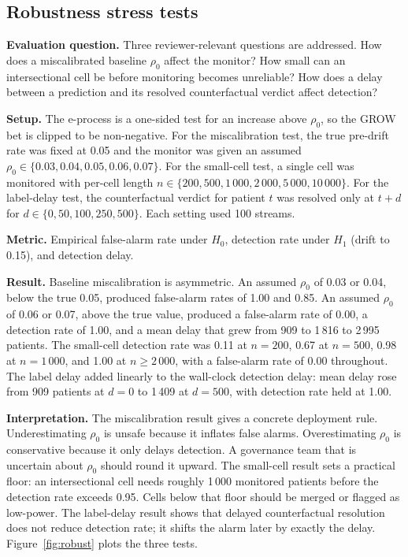 \documentclass[acmsmall,nonacm,review,anonymous]{acmart}
\newcommand{\1}[1]{\mathbf{1}\!\left\{#1\right\}}
\begin{document}
\subsection{Robustness stress tests}\label{sec:exp_robust}

\textbf{Evaluation question.}
Three reviewer-relevant questions are addressed. How does a miscalibrated baseline $\rho_0$ affect the monitor? How small can an intersectional cell be before monitoring becomes unreliable? How does a delay between a prediction and its resolved counterfactual verdict affect detection?

\textbf{Setup.}
The e-process is a one-sided test for an increase above $\rho_0$, so the GROW bet is clipped to be non-negative. For the miscalibration test, the true pre-drift rate was fixed at 0.05 and the monitor was given an assumed $\rho_0 \in \{0.03, 0.04, 0.05, 0.06, 0.07\}$. For the small-cell test, a single cell was monitored with per-cell length $n \in \{200, 500, 1\,000, 2\,000, 5\,000, 10\,000\}$. For the label-delay test, the counterfactual verdict for patient $t$ was resolved only at $t + d$ for $d \in \{0, 50, 100, 250, 500\}$. Each setting used 100 streams.

\textbf{Metric.}
Empirical false-alarm rate under $H_0$, detection rate under $H_1$ (drift to 0.15), and detection delay.

\textbf{Result.}
Baseline miscalibration is asymmetric. An assumed $\rho_0$ of 0.03 or 0.04, below the true 0.05, produced false-alarm rates of 1.00 and 0.85. An assumed $\rho_0$ of 0.06 or 0.07, above the true value, produced a false-alarm rate of 0.00, a detection rate of 1.00, and a mean delay that grew from 909 to 1\,816 to 2\,995 patients. The small-cell detection rate was 0.11 at $n = 200$, 0.67 at $n = 500$, 0.98 at $n = 1\,000$, and 1.00 at $n \ge 2\,000$, with a false-alarm rate of 0.00 throughout. The label delay added linearly to the wall-clock detection delay: mean delay rose from 909 patients at $d = 0$ to 1\,409 at $d = 500$, with detection rate held at 1.00.

\textbf{Interpretation.}
The miscalibration result gives a concrete deployment rule. Underestimating $\rho_0$ is unsafe because it inflates false alarms. Overestimating $\rho_0$ is conservative because it only delays detection. A governance team that is uncertain about $\rho_0$ should round it upward. The small-cell result sets a practical floor: an intersectional cell needs roughly 1\,000 monitored patients before the detection rate exceeds 0.95. Cells below that floor should be merged or flagged as low-power. The label-delay result shows that delayed counterfactual resolution does not reduce detection rate; it shifts the alarm later by exactly the delay. Figure~\ref{fig:robust} plots the three tests.
\end{document}
